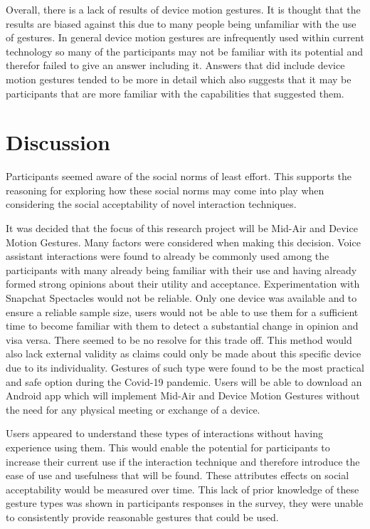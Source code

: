 \documentclass{l4proj}
\begin{document}
Overall, there is a lack of results of device motion gestures. It is thought that the results are biased against this due to many people being unfamiliar with the use of gestures. In general device motion gestures are infrequently used within current technology so many of the participants may not be familiar with its potential and therefor failed to give an answer including it. Answers that did include device motion gestures tended to be more in detail which also suggests that it may be participants that are more familiar with the capabilities that suggested them.

\section{Discussion}

Participants seemed aware of the social norms of least effort. This supports the reasoning for exploring how these social norms may come into play when considering the social acceptability of novel interaction techniques.

It was decided that the focus of this research project will be Mid-Air and Device Motion Gestures. Many factors were considered when making this decision. Voice assistant interactions were found to already be commonly used among the participants with many already being familiar with their use and having already formed strong opinions about their utility and acceptance. Experimentation with Snapchat Spectacles would not be reliable. Only one device was available and to ensure a reliable sample size, users would not be able to use them for a sufficient time to become familiar with them to detect a substantial change in opinion and visa versa. There seemed to be no resolve for this trade off. This method would also lack external validity as claims could only be made about this specific device due to its individuality. Gestures of such type were found to be the most practical and safe option during the Covid-19 pandemic. Users will be able to download an Android app which will implement Mid-Air and Device Motion Gestures without the need for any physical meeting or exchange of a device. 

Users appeared to understand these types of interactions without having experience using them. This would enable the potential for participants to increase their current use if the interaction technique and therefore introduce the ease of use and usefulness that will be found. These attributes effects on social acceptability would be measured over time. This lack of prior knowledge of these gesture types was shown in participants responses in the survey, they were unable to consistently provide reasonable gestures that could be used. 
\end{document}

